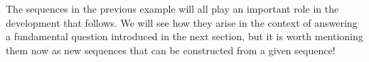 \documentclass{ximera}
\begin{document}
\begin{remark}
The sequences in the previous example will all play an important role in the development that follows.  We will see how they arise in the context of answering a fundamental question introduced in the next section, but it is worth mentioning them now as new sequences that can be constructed from a given sequence!
\end{remark}

%
%
%
%
\end{document}
